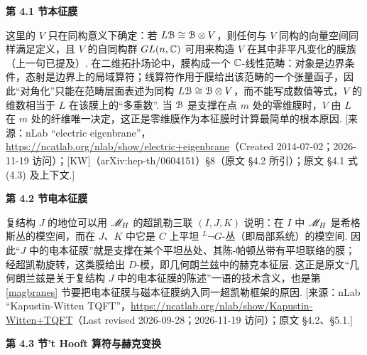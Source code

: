 \medskip\noindent\textbf{第 4.1 节\quad 本征膜}\par\nopagebreak
\begin{description}[leftmargin=5.8em,labelwidth=5em,labelsep=0.6em,itemsep=0.15ex,topsep=0.2ex]
\item[4.1-1] 这里的 $V$ 只在同构意义下确定：若 $L{\mathcal B}\cong {\mathcal B}\otimes V$，则任何与 $V$ 同构的向量空间同样满足定义，且 $V$ 的自同构群 $GL(n,{\mathbb C})$ 可用来构造 $V$ 在其中非平凡变化的膜族（上一句已提及）. 在二维拓扑场论中，膜构成一个 ${\mathbb C}$-线性范畴：对象是边界条件，态射是边界上的局域算符；线算符作用于膜给出该范畴的一个张量函子，因此“对角化”只能在范畴层面表述为同构 $L{\mathcal B}\cong {\mathcal B}\otimes V$，而不能写成数值等式，$V$ 的维数相当于 $L$ 在该膜上的“多重数”. 当 ${\mathcal B}$ 是支撑在点 $m$ 处的零维膜时，$V$ 由 $L$ 在 $m$ 处的纤维唯一决定，这正是零维膜作为本征膜时计算最简单的根本原因. [来源：nLab “electric eigenbrane”，\url{https://ncatlab.org/nlab/show/electric+eigenbrane}（Created 2014-07-02；2026-11-19 访问）；[KW]（arXiv:hep-th/0604151）§8（原文 §4.2 所引）；原文 §4.1 式 (4.3) 及上下文.]
\end{description}
\medskip\noindent\textbf{第 4.2 节\quad 电本征膜}\par\nopagebreak
\begin{description}[leftmargin=5.8em,labelwidth=5em,labelsep=0.6em,itemsep=0.15ex,topsep=0.2ex]
\item[4.2-1] 复结构 $J$ 的地位可以用 ${{\mathscr{M}}_H}$ 的超凯勒三联 $(I,J,K)$ 说明：在 $I$ 中 ${{\mathscr{M}}_H}$ 是希格斯丛的模空间，而在 $J$、$K$ 中它是 $C$ 上平坦 $^L\neg G$-丛（即局部系统）的模空间. 因此“$J$ 中的电本征膜”就是支撑在某个平坦丛处、其陈-帕顿丛带有平坦联络的膜；经超凯勒旋转，这类膜给出 $D$-模，即几何朗兰兹中的赫克本征层. 这正是原文“几何朗兰兹是关于复结构 $J$ 中的电本征膜的陈述”一语的技术含义，也是第 \ref{magbranes} 节要把电本征膜与磁本征膜纳入同一超凯勒框架的原因. [来源：nLab “Kapustin-Witten TQFT”，\url{https://ncatlab.org/nlab/show/Kapustin-Witten+TQFT}（Last revised 2026-09-28；2026-11-19 访问）；原文 §4.2、§5.1.]
\end{description}
\medskip\noindent\textbf{第 4.3 节\quad 't Hooft 算符与赫克变换}\par\nopagebreak
